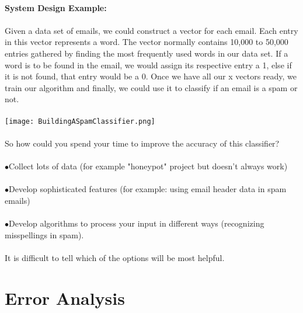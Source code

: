 \documentclass[UTF8]{ctexart}
\begin{document}
\paragraph{}
\textbf{System Design Example:}
\paragraph{}
Given a data set of emails, we could construct a vector for each email. Each entry in this vector represents a word. The vector normally contains 10,000 to 50,000 entries gathered by finding the most frequently used words in our data set. If a word is to be found in the email, we would assign its respective entry a 1, else if it is not found, that entry would be a 0. Once we have all our x vectors ready, we train our algorithm and finally, we could use it to classify if an email is a spam or not.
\paragraph{}
\texttt{[image: BuildingASpamClassifier.png]}
\paragraph{}
So how could you spend your time to improve the accuracy of this classifier?
\paragraph{}
$\bullet$Collect lots of data (for example "honeypot" project but doesn't always work)
\paragraph{}
$\bullet$Develop sophisticated features (for example: using email header data in spam emails)
\paragraph{}
$\bullet$Develop algorithms to process your input in different ways (recognizing misspellings in spam).
\paragraph{}
It is difficult to tell which of the options will be most helpful.
\section{Error Analysis}
\end{document}
